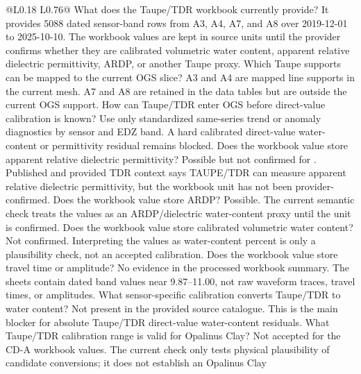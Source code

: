 \begin{longtable}{@{}L{0.18\textwidth} L{0.76\textwidth}@{}}
\toprule
{}
{ What does the Taupe/TDR workbook currently provide?}
{It provides 5088 dated sensor-band rows from A3, A4, A7, and A8 over
2019-12-01 to 2025-10-10.  The workbook values are kept in source units until the
provider confirms whether they are calibrated volumetric water content, apparent
relative dielectric permittivity, ARDP, or another Taupe proxy.}
{ Which Taupe supports can be mapped to the current OGS slice?}
{A3 and A4 are mapped line supports in the current mesh.  A7 and A8 are retained in
the data tables but are outside the current OGS support.}
{ How can Taupe/TDR enter OGS before direct-value calibration is known?}
{Use only standardized same-series trend or anomaly diagnostics by sensor and EDZ
band.  A hard calibrated direct-value water-content or permittivity residual
remains blocked.}
{ Does the workbook value store apparent relative dielectric permittivity?}
{Possible but not confirmed for .  Published and provided TDR
context says TAUPE/TDR can measure apparent relative dielectric permittivity, but
the workbook unit has not been provider-confirmed.}
{ Does the workbook value store ARDP?}
{Possible.  The current semantic check treats the values as an ARDP/dielectric
water-content proxy until the unit is confirmed.}
{ Does the workbook value store calibrated volumetric water content?}
{Not confirmed.  Interpreting the values as water-content percent is only a
plausibility check, not an accepted calibration.}
{ Does the workbook value store travel time or amplitude?}
{No evidence in the processed workbook summary.  The sheets contain dated band values
near 9.87--11.00, not raw waveform traces, travel times, or amplitudes.}
{ What sensor-specific calibration converts Taupe/TDR to water content?}
{Not present in the provided source catalogue.  This is the main blocker for absolute
Taupe/TDR direct-value water-content residuals.}
{ What Taupe/TDR calibration range is valid for Opalinus Clay?}
{Not accepted for the CD-A workbook values.  The current check only tests physical
plausibility of candidate conversions; it does not establish an Opalinus Clay
}
\end{longtable}
